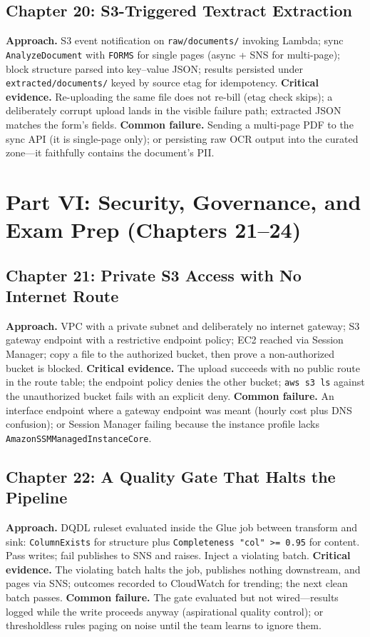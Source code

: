 \subsection{Chapter 20: S3-Triggered Textract Extraction}
\textbf{Approach.} S3 event notification on \texttt{raw/documents/} invoking Lambda; sync
\texttt{AnalyzeDocument} with \texttt{FORMS} for single pages (async + SNS for multi-page);
block structure parsed into key--value JSON; results persisted under
\texttt{extracted/documents/} keyed by source etag for idempotency.
\textbf{Critical evidence.} Re-uploading the same file does not re-bill (etag check skips); a
deliberately corrupt upload lands in the visible failure path; extracted JSON matches the form's
fields.
\textbf{Common failure.} Sending a multi-page PDF to the sync API (it is single-page only); or
persisting raw OCR output into the curated zone---it faithfully contains the document's PII.

\section{Part VI: Security, Governance, and Exam Prep (Chapters 21--24)}
\subsection{Chapter 21: Private S3 Access with No Internet Route}
\textbf{Approach.} VPC with a private subnet and deliberately no internet gateway; S3 gateway
endpoint with a restrictive endpoint policy; EC2 reached via Session Manager; copy a file to the
authorized bucket, then prove a non-authorized bucket is blocked.
\textbf{Critical evidence.} The upload succeeds with no public route in the route table; the
endpoint policy denies the other bucket; \texttt{aws s3 ls} against the unauthorized bucket fails
with an explicit deny.
\textbf{Common failure.} An interface endpoint where a gateway endpoint was meant (hourly cost
plus DNS confusion); or Session Manager failing because the instance profile lacks
\texttt{AmazonSSMManagedInstanceCore}.

\subsection{Chapter 22: A Quality Gate That Halts the Pipeline}
\textbf{Approach.} DQDL ruleset evaluated inside the Glue job between transform and sink:
\texttt{ColumnExists} for structure plus \texttt{Completeness "col" >= 0.95} for content. Pass
writes; fail publishes to SNS and raises. Inject a violating batch.
\textbf{Critical evidence.} The violating batch halts the job, publishes nothing downstream, and
pages via SNS; outcomes recorded to CloudWatch for trending; the next clean batch passes.
\textbf{Common failure.} The gate evaluated but not wired---results logged while the write
proceeds anyway (aspirational quality control); or thresholdless rules paging on noise until the
team learns to ignore them.

